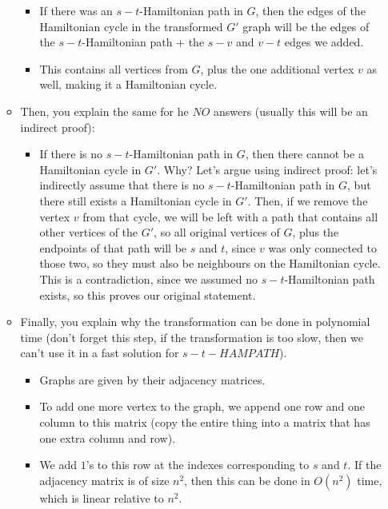 \begin{itemize}
\begin{itemize}
        \begin{itemize}
            \item If there was an $s-t$-Hamiltonian path in $G$, then the edges of the Hamiltonian cycle in the transformed $G'$ graph will be the edges of the $s-t$-Hamiltonian path + the $s-v$ and $v-t$ edges we added.
            \item This contains all vertices from $G$, plus the one additional vertex $v$ as well, making it a Hamiltonian cycle.
        \end{itemize}
        \item Then, you explain the same for he $NO$ answers (usually this will be an indirect proof):
        \begin{itemize}
            \item If there is no $s-t$-Hamiltonian path in $G$, then there cannot be a Hamiltonian cycle in $G'$. Why? Let's argue using indirect proof: let's indirectly assume that there is no $s-t$-Hamiltonian path in $G$, but there still exists a Hamiltonian cycle in $G'$. Then, if we remove the vertex $v$ from that cycle, we will be left with a path that contains all other vertices of the $G'$, so all original vertices of $G$, plus the endpoints of that path will be $s$ and $t$, since $v$ was only connected to those two, so they must also be neighbours on the Hamiltonian cycle. This is a contradiction, since we assumed no $s-t$-Hamiltonian path exists, so this proves our original statement.
        \end{itemize}
        \item Finally, you explain why the transformation can be done in polynomial time (don't forget this step, if the transformation is too slow, then we can't use it in a fast solution for $s-t-HAMPATH$).
        \begin{itemize}
            \item Graphs are given by their adjacency matrices.
            \item To add one more vertex to the graph, we append one row and one column to this matrix (copy the entire thing into a matrix that has one extra column and row).
            \item We add $1$'s to this row at the indexes corresponding to $s$ and $t$. If the adjacency matrix is of size $n^2$, then this can be done in $O(n^2)$ time, which is linear relative to $n^2$.
        \end{itemize}
    \end{itemize}
\end{itemize}

